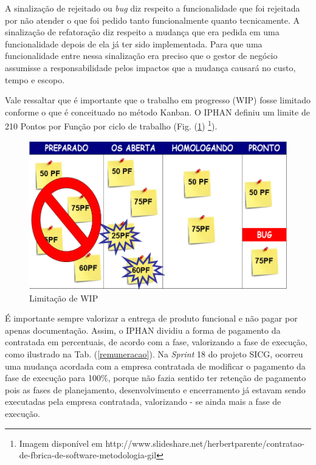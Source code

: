 A sinalização de rejeitado ou \textit{bug} diz respeito a funcionalidade que foi rejeitada por não atender o que foi pedido tanto funcionalmente quanto tecnicamente. A sinalização de refatoração diz respeito a mudança que era pedida em uma funcionalidade depois de ela já ter sido implementada. Para que uma funcionalidade entre nessa sinalização era preciso que o gestor de negócio assumisse a responsabilidade pelos impactos que a mudança causará no custo, tempo e escopo.

Vale ressaltar que é importante que o trabalho em progresso (WIP) fosse limitado conforme o que é conceituado no método Kanban. O IPHAN definiu um limite de 210 Pontos por Função por ciclo de trabalho (Fig. (\ref{kanban4}) \footnote{Imagem disponível em http://www.slideshare.net/herbertparente/contratao-de-fbrica-de-software-metodologia-gil}). 

\begin{figure}[h]
		\centering
		
			\includegraphics[scale=0.5]{figuras/kanbanIPHAN4.png}
		\caption{Limitação de WIP}
		\label{kanban4}
\end{figure}

É importante sempre valorizar a entrega de produto funcional e não pagar por apenas documentação. Assim, o IPHAN dividiu a forma de pagamento da contratada em percentuais, de acordo com a fase, valorizando a fase de execução, como ilustrado na Tab. (\ref{remuneracao}). Na \textit{Sprint} 18 do projeto SICG, ocorreu uma mudança acordada com a empresa contratada de modificar o pagamento da fase de execução para 100\%, porque não fazia sentido ter retenção de pagamento pois as fases de planejamento, desenvolvimento e encerramento já estavam sendo executadas pela empresa contratada, valorizando - se ainda mais a fase de execução.


